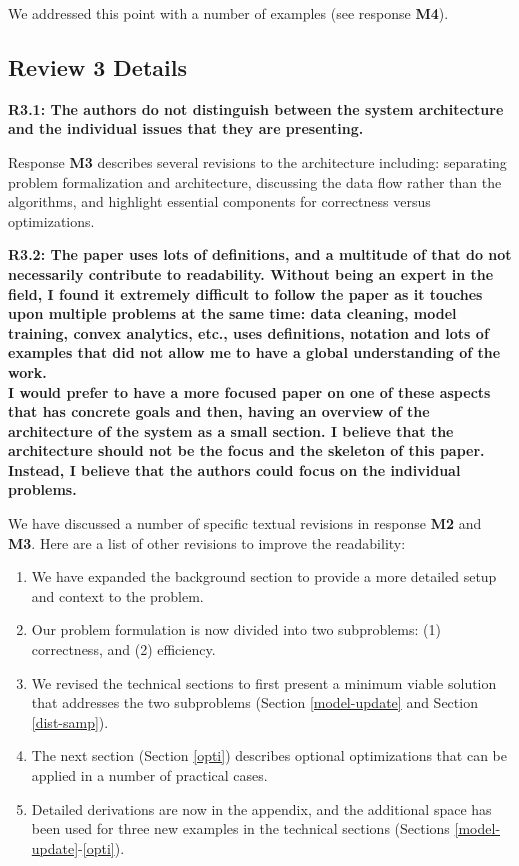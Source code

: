 We addressed this point with a number of examples (see response \textbf{M4}).


\vspace{0.5em}


\subsection*{Review 3 Details}
\noindent\textbf{R3.1: The authors do not distinguish between the system architecture and the individual issues that they are presenting.}

Response \textbf{M3} describes several revisions to the architecture including: separating problem formalization and architecture, discussing the data flow rather than the algorithms, and highlight essential components for correctness versus optimizations.

\vspace{0.5em}

\noindent\textbf{R3.2: The paper uses lots of definitions, and a multitude of that do not necessarily contribute to readability.
Without being an expert in the field, I found it extremely difficult to follow the paper as it touches upon multiple problems at the same time: data cleaning, model training, convex analytics, etc., uses definitions, notation and lots of examples that did not allow me to have a global understanding of the work.\\
I would prefer to have a more focused paper on one of these aspects that has concrete goals and then, having an overview of the architecture of the system as a small section. I believe that the architecture should not be the focus and the skeleton of this paper. Instead, I believe that the authors could focus on the individual problems.}

We have discussed a number of specific textual revisions in response \textbf{M2} and \textbf{M3}. Here are a list of other revisions to improve the readability:

\begin{enumerate}
\item We have expanded the background section to provide a more detailed setup and context to the problem.
\item Our problem formulation is now divided into two subproblems: (1) correctness, and (2) efficiency.
\item We revised the technical sections to first present a minimum viable solution that addresses the two subproblems (Section \ref{model-update} and Section  \ref{dist-samp}).
\item The next section (Section \ref{opti}) describes optional optimizations that can be applied in a number of practical cases.
\item Detailed derivations are now in the appendix, and the additional space has been used for three new examples in the technical sections (Sections \ref{model-update}-\ref{opti}).
\end{enumerate}
